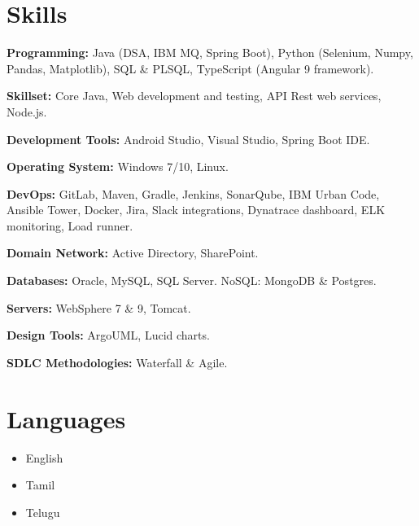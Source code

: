 \documentclass[letterpaper,10pt]{article}
\begin{document}
\section*{Skills}

\textbf{Programming:} Java (DSA, IBM MQ, Spring Boot), Python (Selenium, Numpy, Pandas, Matplotlib), SQL \& PLSQL, TypeScript (Angular 9 framework).

\textbf{Skillset:} Core Java, Web development and testing, API Rest web services, Node.js.

\textbf{Development Tools:} Android Studio, Visual Studio, Spring Boot IDE.

\textbf{Operating System:} Windows 7/10, Linux.

\textbf{DevOps:} GitLab, Maven, Gradle, Jenkins, SonarQube, IBM Urban Code, Ansible Tower, Docker, Jira, Slack integrations, Dynatrace dashboard, ELK monitoring, Load runner.

\textbf{Domain Network:} Active Directory, SharePoint.

\textbf{Databases:} Oracle, MySQL, SQL Server. NoSQL: MongoDB \& Postgres.

\textbf{Servers:} WebSphere 7 \& 9, Tomcat.

\textbf{Design Tools:} ArgoUML, Lucid charts.

\textbf{SDLC Methodologies:} Waterfall \& Agile.


\section*{Languages}

\begin{itemize}
    \item English
    \item Tamil
    \item Telugu
\end{itemize}
\end{document}
